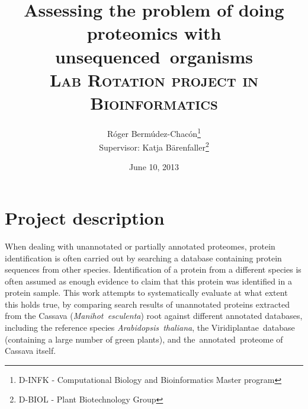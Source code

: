 \documentclass[oneside, a4paper]{memoir}
\title{Assessing the problem of doing proteomics with \mbox{unsequenced organisms}\\
\textsc{\small Lab Rotation project in Bioinformatics}
}
\author{
	        R\'oger Berm\'udez-Chac\'on\thanks{D-INFK - Computational Biology and Bioinformatics Master program}\\
			 Supervisor: Katja B\"arenfaller\thanks{D-BIOL - Plant Biotechnology Group}
}
\date{June 10, 2013}
\begin{document}
\maketitle
\setcounter{secnumdepth}{0}

\section{Project description}
When dealing with unannotated or partially annotated proteomes, protein identif{}ication is often carried out by
searching a database containing protein sequences from other species.
Identif{}ication of a protein from a different species is
often assumed as enough evidence to 
claim that this protein was identif{}ied in
a protein sample.
This work attempts to systematically evaluate at what extent this holds true, by comparing search results of unannotated
proteins extracted from the Cassava \mbox{(\emph{Manihot~esculenta})} root against dif{}ferent annotated databases, including
the reference species \mbox{\emph{Arabidopsis~thaliana}}, the Viridiplantae~database (containing a large number of green plants), and the~annotated~proteome of Cassava itself.
\end{document}

